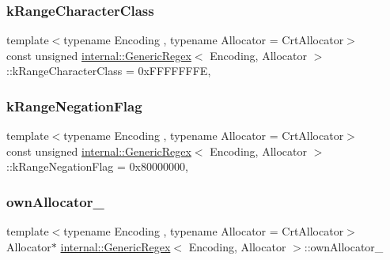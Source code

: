 \mbox{\label{classinternal_1_1GenericRegex_aec665a90fdb2372dbc18a6ca0971e886}} 
\subsubsection{\texorpdfstring{k\+Range\+Character\+Class}{kRangeCharacterClass}}
{\footnotesize\ttfamily template$<$typename Encoding , typename Allocator  = Crt\+Allocator$>$ \\
const unsigned \hyperlink{classinternal_1_1GenericRegex}{internal\+::\+Generic\+Regex}$<$ Encoding, Allocator $>$\+::k\+Range\+Character\+Class = 0x\+F\+F\+F\+F\+F\+F\+FE\hspace{0.3cm}{\ttfamily [static]}, {\ttfamily [private]}}

\mbox{\label{classinternal_1_1GenericRegex_ae435570506343e24811e588614f6842b}} 
\subsubsection{\texorpdfstring{k\+Range\+Negation\+Flag}{kRangeNegationFlag}}
{\footnotesize\ttfamily template$<$typename Encoding , typename Allocator  = Crt\+Allocator$>$ \\
const unsigned \hyperlink{classinternal_1_1GenericRegex}{internal\+::\+Generic\+Regex}$<$ Encoding, Allocator $>$\+::k\+Range\+Negation\+Flag = 0x80000000\hspace{0.3cm}{\ttfamily [static]}, {\ttfamily [private]}}

\mbox{\label{classinternal_1_1GenericRegex_a63f4d8c4e3d61fcd9f1489347708ded8}} 
\subsubsection{\texorpdfstring{own\+Allocator\+\_\+}{ownAllocator\_}}
{\footnotesize\ttfamily template$<$typename Encoding , typename Allocator  = Crt\+Allocator$>$ \\
Allocator$\ast$ \hyperlink{classinternal_1_1GenericRegex}{internal\+::\+Generic\+Regex}$<$ Encoding, Allocator $>$\+::own\+Allocator\+\_\+\hspace{0.3cm}{\ttfamily [private]}}

